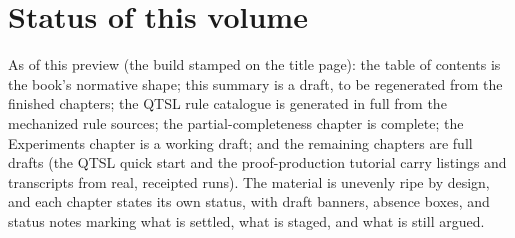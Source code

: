 \section*{Status of this volume}

As of this preview (the build stamped on the title page): the table
of contents is the book's
normative shape; this summary is a draft, to be regenerated from the
finished chapters; the QTSL rule
catalogue is generated in full from the mechanized rule sources; the
partial-completeness chapter is complete; the Experiments chapter is
a working draft; and the remaining chapters are full drafts (the
QTSL quick start and the proof-production tutorial carry listings
and transcripts from real, receipted runs). The material is unevenly
ripe by design, and each chapter states its own status, with draft
banners, absence boxes, and status notes marking what is settled,
what is staged, and what is still argued.

